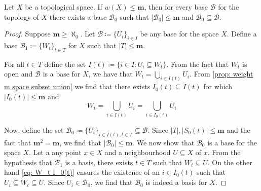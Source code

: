 \begin{proposition}
    Let \(X\) be a topological space. If \(w(X) \leq \mathbf m\), then for every base
    \(\mathcal B\) for the topology of \(X\) there exists a base \(\mathcal B_0\)
    such that \(|\mathcal B_0| \leq \mathbf m\) and \(\mathcal B_0 \subseteq
    \mathcal B\).
\end{proposition}

\begin{proof}
    Suppose \(\mathbf m \geq \aleph_0\). Let \(\mathcal B \coloneq \{U_i\}_{i \in I}\)
    be any base for the space \(X\). Define a base \(\mathcal B_1 \coloneq \{W_t\}_{t
    \in T}\) for \(X\) such that \(|T| \leq \mathbf m\).

    For all \(t \in T\) define the set \(I(t) \coloneq \{i \in I \colon U_i \subseteq
    W_t\}\). From the fact that \(W_t\) is open and \(\mathcal B\) is a base for
    \(X\), we have that \(W_t = \bigcup_{i \in  I(t)} U_i\).  From \cref{prop:
        weight m space subset union} we find that there exists \(I_0(t) \subseteq
    I(t)\) for which \(|I_0(t)| \leq \mathbf m\) and
    \begin{equation}\label{eq: W_t I_0(t)}
        W_t = \bigcup_{i \in  I(t)} U_i = \bigcup_{i \in  I_0(t)} U_i
    \end{equation}

    Now, define the set \(\mathcal B_0 \coloneq \{U_i\}_{i \in I(t), t \in T} \subseteq
    \mathcal B\). Since \(|T|, |S_0(t)| \leq \mathbf m\) and the fact that
    \(\mathbf m^2 = \mathbf m\), we find that \(|\mathcal B_0| \leq \mathbf m\).
    We now show that \(\mathcal B_0\) is a base for the space \(X\). Let a any
    point \(x \in X\) and a neighbourhood \(U \subseteq X\) of \(x\). From the
    hypothesis that \(\mathcal B_1\) is a basis, there exists \(t \in T\) such
    that \(W_t \subseteq U\). On the other hand \cref{eq: W_t I_0(t)} ensures the
    existence of an \(i \in I_0(t)\) such that \(U_i \subseteq W_t \subseteq U\).
    Since \(U_i \in \mathcal B_0\), we find that \(\mathcal B_0\) is indeed a
    basis for \(X\).
\end{proof}

